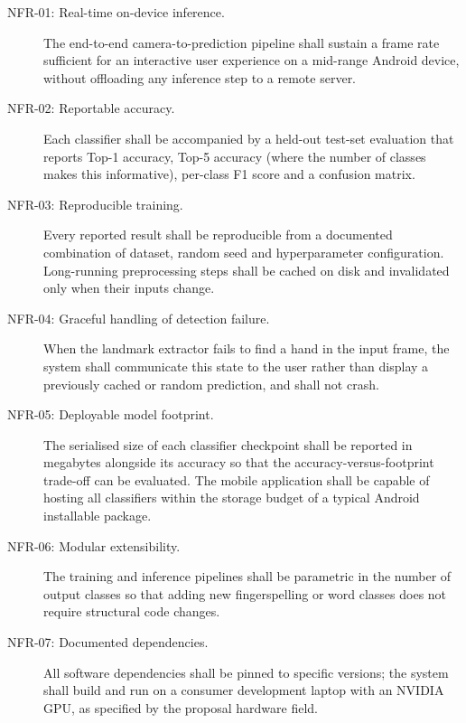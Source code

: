 \begin{description}
  \item[NFR-01: Real-time on-device inference.] The end-to-end
        camera-to-prediction pipeline shall sustain a frame rate
        sufficient for an interactive user experience on a
        mid-range Android device, without offloading any inference
        step to a remote server.

  \item[NFR-02: Reportable accuracy.] Each classifier shall be
        accompanied by a held-out test-set evaluation that reports
        Top-1 accuracy, Top-5 accuracy (where the number of classes
        makes this informative), per-class F1 score and a confusion
        matrix.

  \item[NFR-03: Reproducible training.] Every reported result
        shall be reproducible from a documented combination of
        dataset, random seed and hyperparameter configuration.
        Long-running preprocessing steps shall be cached on disk
        and invalidated only when their inputs change.

  \item[NFR-04: Graceful handling of detection failure.] When
        the landmark extractor fails to find a hand in the input
        frame, the system shall communicate this state to the user
        rather than display a previously cached or random
        prediction, and shall not crash.

  \item[NFR-05: Deployable model footprint.] The serialised size
        of each classifier checkpoint shall be reported in
        megabytes alongside its accuracy so that the
        accuracy-versus-footprint trade-off can be evaluated. The
        mobile application shall be capable of hosting all
        classifiers within the storage budget of a typical Android
        installable package.

  \item[NFR-06: Modular extensibility.] The training and
        inference pipelines shall be parametric in the number of
        output classes so that adding new fingerspelling or word
        classes does not require structural code changes.

  \item[NFR-07: Documented dependencies.] All software
        dependencies shall be pinned to specific versions; the
        system shall build and run on a consumer development laptop
        with an NVIDIA GPU, as specified by the proposal hardware
        field.
\end{description}

